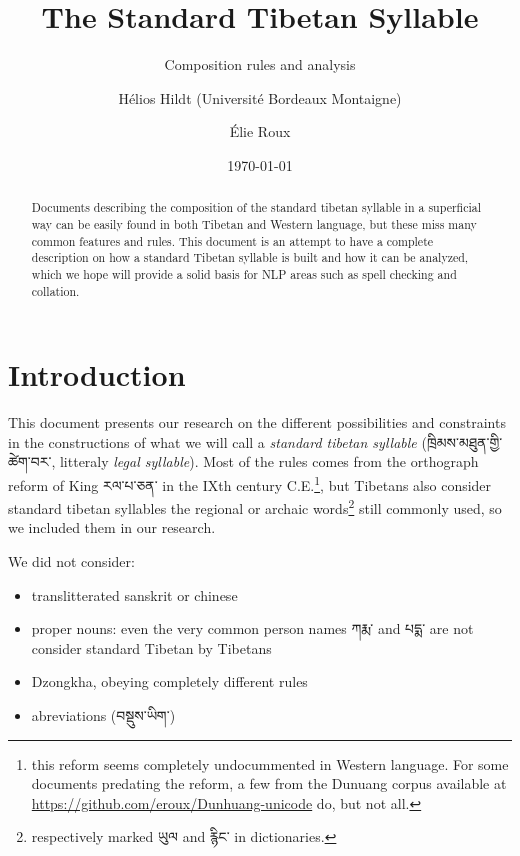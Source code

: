 \documentclass[%
a4paper,%
pagesize,%
12pt,%
parskip=off,%
bibliography=totoc,%
numbers=noenddot,%
DIV=12,%
twoside=semi,%
headings=normal%
]{scrartcl}
\title{The Standard Tibetan Syllable}
\subtitle{Composition rules and analysis}
\author{Hélios Hildt (Université Bordeaux Montaigne) \and Élie Roux}
\date{\today}
\begin{document}
\maketitle

\begin{abstract}
Documents describing the composition of the standard tibetan syllable in a superficial way can be easily found in both Tibetan and Western language, but these miss many common features and rules. This document is an attempt to have a complete description on how a standard Tibetan syllable is built and how it can be analyzed, which we hope will provide a solid basis for NLP areas such as spell checking and collation.
\end{abstract}


\tableofcontents

\newpage

\section{Introduction}

This document presents our research on the different possibilities and constraints in the constructions of what we will call a \emph{standard tibetan syllable} (ཁྲིམས་མཐུན་གྱི་ཚེག་བར་, litteraly \emph{legal syllable}). Most of the rules comes from the orthograph reform of King རལ་པ་ཅན་ in the \textsc{IX}th century \textsc{C.E.}\footnote{this reform seems completely undocummented in Western language. For some documents predating the reform, a few from  the Dunuang corpus available at \url{https://github.com/eroux/Dunhuang-unicode} do, but not all.}, but Tibetans also consider standard tibetan syllables the regional or archaic words\footnote{respectively marked ཡུལ and རྙིང་ in dictionaries.} still commonly used, so we included them in our research.

We did not consider:

\begin{itemize}
\item translitterated sanskrit or chinese
\item proper nouns: even the very common person names ཀརྨ་ and པདྨ་ are not consider standard Tibetan by Tibetans
\item Dzongkha, obeying completely different rules
\item abreviations (བསྡུས་ཡིག་)
\end{itemize}
\end{document}
